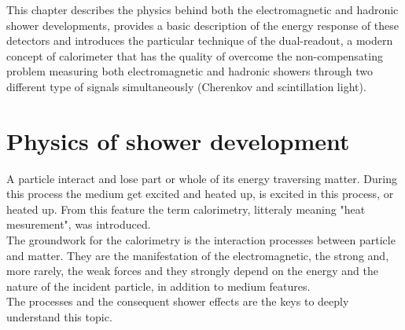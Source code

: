 
This chapter describes the physics behind both the electromagnetic and hadronic shower developments, provides a basic description of the energy response of these detectors and introduces the particular technique of the dual-readout, a modern concept of calorimeter that has the quality of overcome the non-compensating problem measuring both electromagnetic and hadronic showers through two different type of signals simultaneously (Cherenkov and scintillation light).\\

\section{Physics of shower development}
A particle interact and lose part or whole of its energy traversing matter. During this process the medium get excited and heated up, is excited in this process, or heated up. From this feature the term calorimetry, litteraly meaning "heat mesurement", was introduced.\\
The groundwork for the calorimetry is the interaction processes between particle and matter. They are the manifestation of the electromagnetic, the strong and, more rarely, the weak forces and they strongly depend on the energy and the nature of the incident particle, in addition to medium features.\\
The processes and the consequent shower effects are the keys to deeply understand this topic.\\

